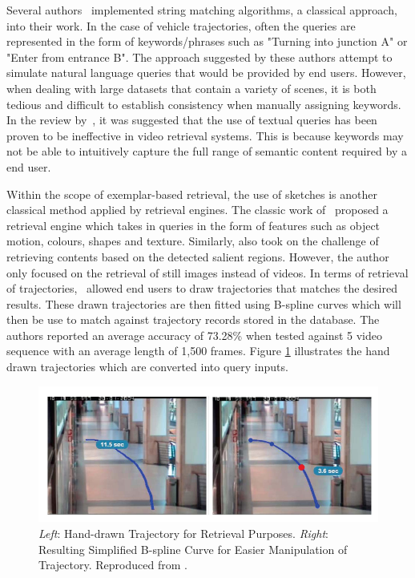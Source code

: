 Several authors~\cite{feris2012large,momin2015vehicle,yang2015semantic} implemented string matching algorithms, a classical approach, into their work. In the case of vehicle trajectories, often the queries are represented in the form of keywords/phrases such as "Turning into junction A" or "Enter from entrance B". The approach suggested by these authors attempt to simulate natural language queries that would be provided by end users. However, when dealing with large datasets that contain a variety of scenes, it is both tedious and difficult to establish consistency when manually assigning keywords. In the review by~, it was suggested that the use of textual
queries has been proven to be ineffective in video retrieval systems. This is
because keywords may not be able to intuitively capture the full range of semantic content
required by a end user.

Within the scope of exemplar-based retrieval, the use of sketches is
another classical method applied by retrieval engines. The classic work of~ proposed a retrieval engine which takes in queries in the form of features such as object motion, colours, shapes and texture. Similarly,
 also took on the challenge of retrieving contents based
on the detected salient regions. However, the author only focused on the retrieval of still images instead of videos. In terms of retrieval of trajectories,~ allowed end users to draw trajectories that
matches the desired results. These drawn trajectories are then fitted using
B-spline curves which will then be use to match against trajectory records stored in
the database. The authors reported an average accuracy of 73.28\% when tested
against 5 video sequence with an average length of 1,500 frames. Figure
\ref{fig:drawquery1} illustrates the hand drawn trajectories which are converted
into query inputs.


\begin{figure}[hbt!]
  \centering
  \includegraphics[width=.9\textwidth]{image/lit/trajdraw1.PNG}
  \caption[\textit{Left}: Hand-drawn Trajectory for Retrieval Purposes.
  \textit{Right}: Resulting Simplified B-spline Curve for Easier Manipulation of
  Trajectory] {\textit{Left}: Hand-drawn Trajectory for Retrieval Purposes.
  \textit{Right}: Resulting Simplified B-spline Curve for Easier Manipulation of
  Trajectory. Reproduced from .}
  \label{fig:drawquery1}
\end{figure}

